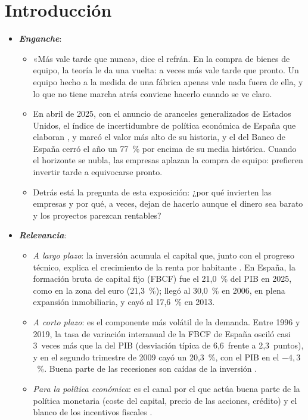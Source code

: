 \documentclass[11pt]{article}
\begin{document}
\tceetitulo

\section*{Introducción}

\begin{itemize}
\item \textbf{\emph{Enganche}}:
  \begin{itemize}
  \item «Más vale tarde que nunca», dice el refrán. En la compra de bienes de equipo, la teoría le da una vuelta: a veces más vale tarde que pronto. Un equipo hecho a la medida de una fábrica apenas vale nada fuera de ella, y lo que no tiene marcha atrás conviene hacerlo cuando se ve claro.
  \item En abril de 2025, con el anuncio de aranceles generalizados de Estados Unidos, el índice de incertidumbre de política económica de España que elaboran ,  y  marcó el valor más alto de su historia\nocite{BakerBloomDavis2026EPU}, y el del Banco de España cerró el año un 77~\% por encima de su media histórica\nocite{BdE2026EPU}. Cuando el horizonte se nubla, las empresas aplazan la compra de equipo: prefieren invertir tarde a equivocarse pronto.
  \item Detrás está la pregunta de esta exposición: ¿por qué invierten las empresas y por qué, a veces, dejan de hacerlo aunque el dinero sea barato y los proyectos parezcan rentables?
  \end{itemize}

\item \textbf{\emph{Relevancia}}:
  \begin{itemize}
  \item \emph{A largo plazo}: la inversión acumula el capital que, junto con el progreso técnico, explica el crecimiento de la renta por habitante . En España, la formación bruta de capital fijo (FBCF) fue el 21,0~\% del PIB en 2025, como en la zona del euro (21,3~\%); llegó al 30,0~\% en 2006, en plena expansión inmobiliaria, y cayó al 17,6~\% en 2013\nocite{INE2026CNTRActivos,Eurostat2026nama10gdp}.
  \item \emph{A corto plazo}: es el componente más volátil de la demanda. Entre 1996 y 2019, la tasa de variación interanual de la FBCF de España osciló casi 3~veces más que la del PIB (desviación típica de 6,6~frente a 2,3~puntos), y en el segundo trimestre de 2009 cayó un 20,3~\%, con el PIB en el $-4{,}3$~\%\nocite{INE2026CNTRVolumen}. Buena parte de las recesiones son caídas de la inversión .
  \item \emph{Para la política económica}: es el canal por el que actúa buena parte de la política monetaria (coste del capital, precio de las acciones, crédito)  y el blanco de los incentivos fiscales .
  \end{itemize}


\end{itemize}
\end{document}
